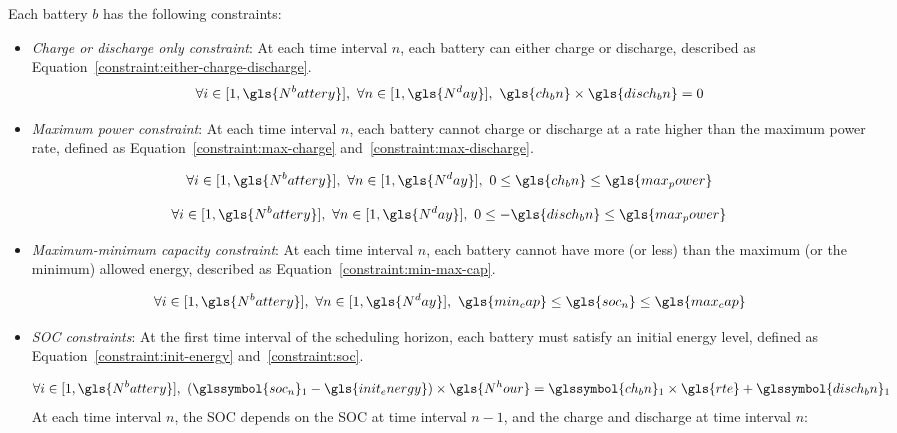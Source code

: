 Each battery $b$ has the following constraints:

\begin{itemize}
	\item \textit{Charge or discharge only constraint}: At each time interval $n$, each battery can either charge or discharge, described as Equation~\ref{constraint:either-charge-discharge}.
	\begin{equation}
		\label{constraint:either-charge-discharge}
		\forall i \in [1, \gls{N^battery}], ~ \forall n \in [1, \gls{N^day}],~ \gls{ch_bn} \times \gls{disch_bn} = 0
	\end{equation}
	
	\item \textit{Maximum power constraint}: At each time interval $n$, each battery cannot charge or discharge at a rate higher than the maximum power rate, defined as Equation~\ref{constraint:max-charge} and~\ref{constraint:max-discharge}.
	
	\begin{equation}
		\label{constraint:max-charge}
		\forall i \in [1, \gls{N^battery}], ~ \forall n \in [1, \gls{N^day}],~ 0 \leq \gls{ch_bn} \leq \gls{max_power}
	\end{equation}
	
	\begin{equation}
		\label{constraint:max-discharge}
		\forall i \in [1, \gls{N^battery}], ~ \forall n \in [1, \gls{N^day}],~ 0 \leq -\gls{disch_bn} \leq \gls{max_power}
	\end{equation}
	
	\item \textit{Maximum-minimum capacity constraint}: At each time interval $n$, each battery cannot have more (or less) than the maximum (or the minimum) allowed energy, described as Equation~\ref{constraint:min-max-cap}.
	
	\begin{equation}
		\label{constraint:min-max-cap}
		\forall i \in [1, \gls{N^battery}], ~ \forall n \in [1, \gls{N^day}],~ \gls{min_cap} \leq \gls{soc_n} \leq \gls{max_cap}
	\end{equation}
	
	\item \textit{\gls{SOC} constraints}: At the first time interval of the scheduling horizon, each battery must satisfy an initial energy level, defined as Equation~\ref{constraint:init-energy} and~\ref{constraint:soc}.
	
	\begin{equation}
		\label{constraint:init-energy}
		\forall i \in [1, \gls{N^battery}], ~(\glssymbol{soc_n} \text{}_1 - \gls{init_energy}) \times \gls{N^hour} = \glssymbol{ch_bn} \text{}_1 \times \gls{rte} + \glssymbol{disch_bn} \text{}_1
	\end{equation}
	At each time interval $n$, the \gls{SOC} depends on the \gls{SOC} at time interval $n-1$, and the charge and discharge at time interval $n$:
	

\end{itemize}
